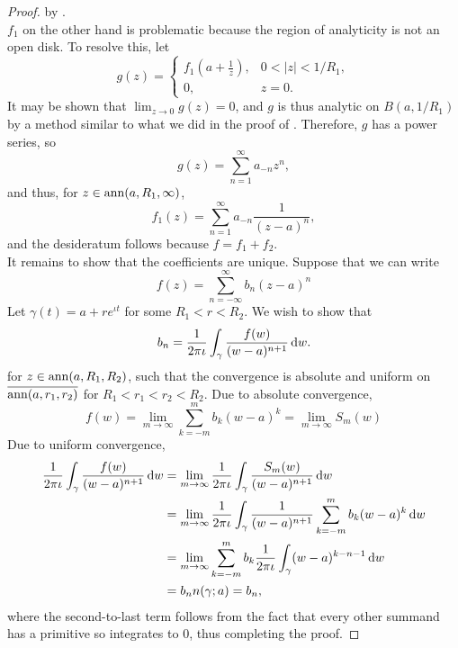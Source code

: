 \begin{proof}
			by .\\
			$f_1$ on the other hand is problematic because the region of analyticity is not an open disk. To resolve this, let
			\[ g(z) = \begin{cases} f_1(a+\frac{1}{z}), & 0 < |z| < 1/R_1, \\ 0, & z = 0. \end{cases} \]
			It may be shown that $\lim_{z\to 0} g(z) = 0$, and $g$ is thus analytic on $B(a,1/R_1)$ by a method similar to what we did in the proof of . Therefore, $g$ has a power series, so
			\[ g(z) = \sum_{n=1}^{\infty} a_{-n} z^n, \]
			and thus, for $z \in \operatorname{ann}(a,R_1,\infty)$,
			\[ f_1(z) = \sum_{n=1}^{\infty} a_{-n} \frac{1}{(z-a)^n}, \]
			and the desideratum follows because $f = f_1 + f_2$.\\

			It remains to show that the coefficients are unique. Suppose that we can write
			\[ f(z) = \sum_{n=-\infty}^{\infty} b_n (z-a)^n \]
			Let $\gamma(t) = a+re^{\iota t}$ for some $R_1 < r < R_2$. We wish to show that
			\[ b_n = \frac{1}{2\pi\iota} \int_{\gamma} \frac{f(w)}{(w-a)^{n+1}} \dif w. \]
			for $z \in \operatorname{ann}(a,R_1,R_2)$, such that the convergence is absolute and uniform on $\overline{\operatorname{ann}(a,r_1,r_2)}$ for $R_1 < r_1 < r_2 < R_2$. Due to absolute convergence,
			\[ f(w) = \lim_{m\to\infty} \sum_{k=-m}^m b_k (w-a)^k = \lim_{m\to\infty} S_m(w)  \]
			Due to uniform convergence,
			\begin{align*}
				\frac{1}{2\pi\iota} \int_{\gamma} \frac{f(w)}{(w-a)^{n+1}} \dif w &= \lim_{m\to\infty} \frac{1}{2\pi\iota} \int_{\gamma} \frac{S_m(w)}{(w-a)^{n+1}} \dif w \\
					&= \lim_{m\to\infty} \frac{1}{2\pi\iota} \int_{\gamma} \frac{1}{(w-a)^{n+1}} \sum_{k=-m}^m b_k (w-a)^k \dif w \\
					&= \lim_{m\to\infty} \sum_{k=-m}^m b_k \frac{1}{2\pi\iota} \int_{\gamma}(w-a)^{k-n-1} \dif w \\
					&= b_n n(\gamma;a) = b_n,
			\end{align*}
			where the second-to-last term follows from the fact that every other summand has a primitive so integrates to $0$, thus completing the proof.
		\end{proof}
